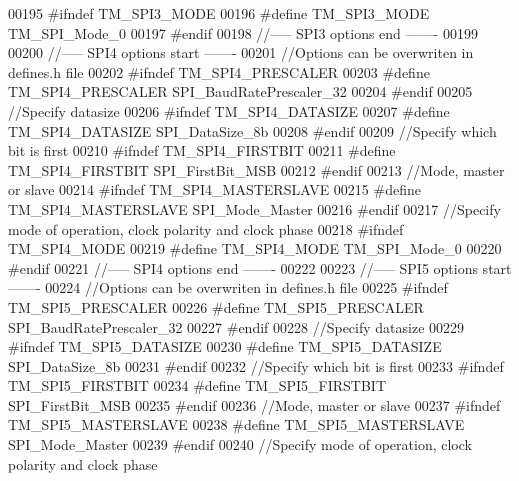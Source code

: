 \begin{DoxyCode}
00195 \textcolor{preprocessor}{#ifndef TM\_SPI3\_MODE}
00196 \textcolor{preprocessor}{#define TM\_SPI3\_MODE        TM\_SPI\_Mode\_0}
00197 \textcolor{preprocessor}{#endif}
00198 \textcolor{comment}{//----- SPI3 options end -------}
00199 
00200 \textcolor{comment}{//----- SPI4 options start -------}
00201 \textcolor{comment}{//Options can be overwriten in defines.h file}
00202 \textcolor{preprocessor}{#ifndef TM\_SPI4\_PRESCALER}
00203 \textcolor{preprocessor}{#define TM\_SPI4\_PRESCALER   SPI\_BaudRatePrescaler\_32}
00204 \textcolor{preprocessor}{#endif}
00205 \textcolor{comment}{//Specify datasize}
00206 \textcolor{preprocessor}{#ifndef TM\_SPI4\_DATASIZE}
00207 \textcolor{preprocessor}{#define TM\_SPI4\_DATASIZE    SPI\_DataSize\_8b}
00208 \textcolor{preprocessor}{#endif}
00209 \textcolor{comment}{//Specify which bit is first}
00210 \textcolor{preprocessor}{#ifndef TM\_SPI4\_FIRSTBIT}
00211 \textcolor{preprocessor}{#define TM\_SPI4\_FIRSTBIT    SPI\_FirstBit\_MSB}
00212 \textcolor{preprocessor}{#endif}
00213 \textcolor{comment}{//Mode, master or slave}
00214 \textcolor{preprocessor}{#ifndef TM\_SPI4\_MASTERSLAVE}
00215 \textcolor{preprocessor}{#define TM\_SPI4\_MASTERSLAVE SPI\_Mode\_Master}
00216 \textcolor{preprocessor}{#endif}
00217 \textcolor{comment}{//Specify mode of operation, clock polarity and clock phase}
00218 \textcolor{preprocessor}{#ifndef TM\_SPI4\_MODE}
00219 \textcolor{preprocessor}{#define TM\_SPI4\_MODE        TM\_SPI\_Mode\_0}
00220 \textcolor{preprocessor}{#endif}
00221 \textcolor{comment}{//----- SPI4 options end -------}
00222 
00223 \textcolor{comment}{//----- SPI5 options start -------}
00224 \textcolor{comment}{//Options can be overwriten in defines.h file}
00225 \textcolor{preprocessor}{#ifndef TM\_SPI5\_PRESCALER}
00226 \textcolor{preprocessor}{#define TM\_SPI5\_PRESCALER   SPI\_BaudRatePrescaler\_32}
00227 \textcolor{preprocessor}{#endif}
00228 \textcolor{comment}{//Specify datasize}
00229 \textcolor{preprocessor}{#ifndef TM\_SPI5\_DATASIZE}
00230 \textcolor{preprocessor}{#define TM\_SPI5\_DATASIZE    SPI\_DataSize\_8b}
00231 \textcolor{preprocessor}{#endif}
00232 \textcolor{comment}{//Specify which bit is first}
00233 \textcolor{preprocessor}{#ifndef TM\_SPI5\_FIRSTBIT}
00234 \textcolor{preprocessor}{#define TM\_SPI5\_FIRSTBIT    SPI\_FirstBit\_MSB}
00235 \textcolor{preprocessor}{#endif}
00236 \textcolor{comment}{//Mode, master or slave}
00237 \textcolor{preprocessor}{#ifndef TM\_SPI5\_MASTERSLAVE}
00238 \textcolor{preprocessor}{#define TM\_SPI5\_MASTERSLAVE SPI\_Mode\_Master}
00239 \textcolor{preprocessor}{#endif}
00240 \textcolor{comment}{//Specify mode of operation, clock polarity and clock phase}

\end{DoxyCode}
